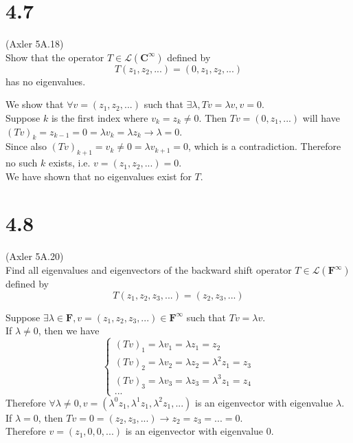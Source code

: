 \documentclass{article}
\begin{document}
\section*{4.7}
(Axler 5A.18)\\
Show that the operator $T \in\mathcal{L}(\mathbf{C}^{\infty})$ defined by
\begin{equation*}
    T(z_1, z_2, ...) = (0, z_1, z_2, ...)
\end{equation*}
has no eigenvalues.
\begin{addmargin}[1em]{0em}
    We show that $\forall v = (z_1, z_2, ...)$ such that $\exists \lambda, Tv = \lambda v, v = 0$.\\
    Suppose $k$ is the first index where $v_k = z_k \neq 0$. Then $Tv = (0, z_1, ...)$ will have $(Tv)_k = z_{k-1} = 0 = \lambda v_k = \lambda z_k \rightarrow \lambda = 0$.\\
    Since also $(Tv)_{k+1} = v_k \neq 0 = \lambda v_{k+1} = 0$, which is a contradiction. Therefore no such $k$ exists, i.e. $v = (z_1, z_2, ...) = 0$.\\
    We have shown that no eigenvalues exist for $T$.
\end{addmargin}
\section*{4.8}
(Axler 5A.20)\\
Find all eigenvalues and eigenvectors of the backward shift operator $T \in \mathcal{L}(\mathbf{F}^{\infty})$ defined by
\begin{equation*}
    T(z_1, z_2, z_3, ...) = (z_2, z_3, ...)
\end{equation*}
\begin{addmargin}[1em]{0em}
    Suppose $\exists \lambda \in \mathbf{F}, v = (z_1, z_2, z_3, ...) \in \mathbf{F}^\infty$ such that $Tv = \lambda v$.\\
    If $\lambda \neq 0$, then we have
    \begin{equation*}
        \begin{cases}
            (Tv)_1 = \lambda v_1 = \lambda z_1 = z_2\\
            (Tv)_2 = \lambda v_2 = \lambda z_2 = \lambda^2 z_1 = z_3\\
            (Tv)_3 = \lambda v_3 = \lambda z_3 = \lambda^3 z_1 = z_4\\
            ...
        \end{cases}
    \end{equation*}
    Therefore $\forall \lambda \neq 0, v = (\lambda^0z_1, \lambda^1z_1, \lambda^2z_1, ...)$ is an eigenvector with eigenvalue $\lambda$.\\
    If $\lambda = 0$, then $Tv = 0 = (z_2, z_3, ...) \rightarrow z_2 = z_3 = ... = 0$.\\
    Therefore $v = (z_1, 0, 0, ...)$ is an eigenvector with eigenvalue $0$.
\end{addmargin}
\end{document}
